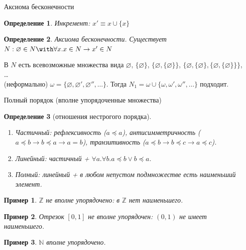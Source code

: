 \documentclass[aspectratio=169]{beamer}
\newtheorem{dfn}{Определение}[section]
\newtheorem{exm}{Пример}[section]
\begin{document}
\begin{frame}{Аксиома бесконечности}
\begin{dfn}Инкремент: $x' \equiv x \cup \{x\}$\end{dfn}\pause
\begin{dfn}Аксиома бесконечности. Существует $N: \varnothing \in N \with \forall x.x \in N\rightarrow x' \in N$\end{dfn}\pause

В $N$ есть всевозможные множества вида $\varnothing$\pause, $\{\varnothing\}$\pause, $\{\varnothing,\{\varnothing\}\}$, \pause
$\{\varnothing,\{\varnothing\},\{\varnothing,\{\varnothing\}\}\}$, \dots\pause
\\\vspace{0.5cm}
(неформально) $\omega = \{\varnothing, \varnothing', \varnothing'', \dots\}$. \pause
Тогда $N_1 = \omega\cup\{\omega,\omega',\omega'',\dots\}$ подходит.
\end{frame}

\begin{frame}{Полный порядок (вполне упорядоченные множества)}
\begin{dfn}[отношения нестрогого порядка]
\begin{enumerate}
\item Частичный: рефлексивность ($a \preceq a$), антисимметричность ($a \preceq b \rightarrow b \preceq a\rightarrow a=b$),
транзитивность ($a \preceq b \rightarrow b \preceq c \rightarrow a \preceq c$).\pause
\item Линейный: частичный + $\forall a.\forall b.a \preceq b \vee b \preceq a$.\pause
\item Полный: линейный + в любом непустом подмножестве есть наименьший элемент.\pause
\end{enumerate}
\end{dfn}

\begin{exm}$\mathbb{Z}$ не вполне упорядочено: в $\mathbb{Z}$ нет наименьшего.\end{exm}\pause
\begin{exm}Отрезок $[0,1]$ не вполне упорядочен: $(0,1)$ не имеет наименьшего.\end{exm}\pause
\begin{exm}$\mathbb{N}$ вполне упорядочено.\end{exm}
\end{frame}
\end{document}
